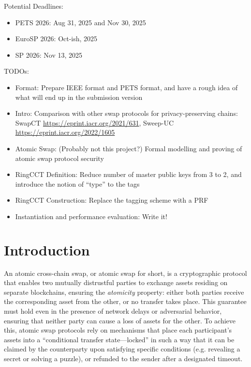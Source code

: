 
\begin{todobox}
    Potential Deadlines: 
    \begin{itemize}
        \item PETS 2026: Aug 31, 2025 and Nov 30, 2025
        \item EuroSP 2026: Oct-ish, 2025 
        \item SP 2026: Nov 13, 2025 
    \end{itemize}

    TODOs:
    \begin{itemize}
        \item Format: Prepare IEEE format and PETS format, and have a rough idea of what will end up in the submission version
        \item Intro: Comparison with other swap protocols for privacy-preserving chains: SwapCT \url{https://eprint.iacr.org/2021/631}, Sweep-UC \url{https://eprint.iacr.org/2022/1605}
        \item Atomic Swap: (Probably not this project?) Formal modelling and proving of atomic swap protocol security
        \item RingCCT Definition: Reduce number of master public keys from 3 to 2, and introduce the notion of ``type'' to the tags
        \item RingCCT Construction: Replace the tagging scheme with a PRF
        \item Instantiation and performance evaluation: Write it!
    \end{itemize}
\end{todobox}

\section{Introduction}

An atomic cross-chain swap, or atomic swap for short, is a cryptographic protocol that enables two mutually distrustful parties to exchange assets residing on separate blockchains, ensuring the \textit{atomicity} property: either both parties receive the corresponding asset from the other, or no transfer takes place. 
This guarantee must hold even in the presence of network delays or adversarial behavior, ensuring that neither party can cause a loss of assets for the other. 
To achieve this, atomic swap protocols rely on mechanisms that place each participant’s assets into a ``conditional transfer state—locked'' in such a way that it can be claimed by the counterparty upon satisfying specific conditions (e.g. revealing a secret or solving a puzzle), or refunded to the sender after a designated timeout. 

